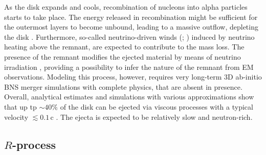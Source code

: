 As the disk expands and cools, recombination of nucleons into alpha particles 
starts to take place. The energy released in recombination might be sufficient 
for the outermost layers to become unbound, leading to a massive outflow,  
depleting the disk \citep{Beloborodov:2008nx,Lee:2009uc,Fernandez:2013tya}.
%
%
Furthermore, so-called neutrino-driven winds (\nwind{}; \citet{Dessart:2008zd,Perego:2014fma,Just:2014fka})
induced by neutrino heating above the remnant, 
are expected to contribute to the mass loss. 
%
The presence of the remnant modifies the ejected material by means of 
neutrino irradiation \citep{Fernandez:2015use}, providing a possibility to infer the nature of 
the remnant from \ac{EM} observations. Modeling this process, however, requires very long-term 
$3$D ab-initio \ac{BNS} merger simulations with complete physics, that are absent in presence.
%
Overall, analytical estimates and simulations with various approximations show that 
up tp ${\sim}40\%$ of the disk can be ejected via viscous processes with a 
typical velocity ${\lesssim}0.1\,$c \citep{Fernandez:2018kax,Radice:2018xqa}.
The ejecta is expected to be relatively slow and neutron-rich. 



\subsection{$R$-process \nuc{}} \label{sec:intro:nucleo}

